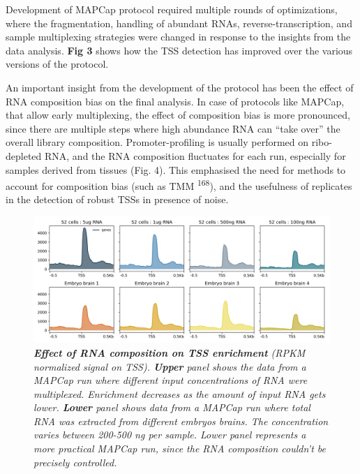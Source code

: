 \documentclass[11pt,twoside]{MPIthesis}
\theoremstyle{definition}
\theoremstyle{definition}
\theoremstyle{definition}
\theoremstyle{remark}
\begin{document}
Development of MAPCap protocol required multiple rounds of
optimizations, where the fragmentation, handling of abundant RNAs,
reverse-transcription, and sample multiplexing strategies were changed
in response to the insights from the data analysis. \textbf{Fig 3} shows
how the TSS detection has improved over the various versions of the
protocol.

An important insight from the development of the protocol has been the
effect of RNA composition bias on the final analysis. In case of
protocols like MAPCap, that allow early multiplexing, the effect of
composition bias is more pronounced, since there are multiple steps
where high abundance RNA can ``take over'' the overall library
composition. Promoter-profiling is usually performed on ribo-depleted
RNA, and the RNA composition fluctuates for each run, especially for
samples derived from tissues (Fig. 4). This emphasised the need for
methods to account for composition bias (such as TMM
\textsuperscript{168}), and the usefulness of replicates in the
detection of robust TSSs in presence of noise.
\begin{figure}

{\centering \includegraphics[width=0.9\linewidth]{figures/results_fig5} 

}

\caption[Effect of RNA composition on TSS enrichment]{\emph{\textbf{Effect of RNA composition on TSS enrichment}
(RPKM normalized signal on TSS). \textbf{Upper} panel shows the data
from a MAPCap run where different input concentrations of RNA were
multiplexed. Enrichment decreases as the amount of input RNA gets lower.
\textbf{Lower} panel shows data from a MAPCap run where total RNA was
extracted from different embryos brains. The concentration varies
between 200-500 ng per sample. Lower panel represents a more practical
MAPCap run, since the RNA composition couldn't be precisely controlled.}}\label{fig:unnamed-chunk-10}
\end{figure}
\end{document}
